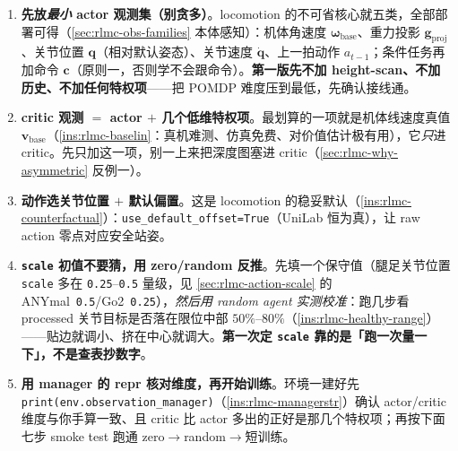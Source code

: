 \begin{enumerate}
  \item \textbf{先放\emph{最小} actor 观测集（别贪多）}。locomotion 的不可省核心就五类，全部部署可得（\cref{sec:rlmc-obs-families} 本体感知）：机体角速度 $\boldsymbol\omega_{\text{base}}$、重力投影 $\mathbf g_{\text{proj}}$、关节位置 $\mathbf q$（相对默认姿态）、关节速度 $\dot{\mathbf q}$、上一拍动作 $a_{t-1}$；条件任务再加命令 $\mathbf c$（原则一，否则学不会跟命令）。\textbf{第一版先不加 height-scan、不加历史、不加任何特权项}——把 POMDP 难度压到最低，先确认接线通。
  \item \textbf{critic 观测 $=$ actor $+$ 几个低维特权项}。最划算的一项就是机体线速度真值 $\mathbf v_{\text{base}}$（\cref{ins:rlmc-baselin}：真机难测、仿真免费、对价值估计极有用），它\emph{只}进 critic。先只加这一项，别一上来把深度图塞进 critic（\cref{sec:rlmc-why-asymmetric} 反例一）。
  \item \textbf{动作选关节位置 $+$ 默认偏置}。这是 locomotion 的稳妥默认（\cref{ins:rlmc-counterfactual}）：\verb|use_default_offset=True|（UniLab 恒为真），让 raw action 零点对应安全站姿。
  \item \textbf{\texttt{scale} 初值不要猜，用 zero/random 反推}。先填一个保守值（腿足关节位置 \verb|scale| 多在 \texttt{0.25}--\texttt{0.5} 量级，见 \cref{sec:rlmc-action-scale} 的 ANYmal~\texttt{0.5}/Go2~\texttt{0.25}），\emph{然后用 random agent 实测校准}：跑几步看 processed 关节目标是否落在限位中部 $50\%$--$80\%$（\cref{ins:rlmc-healthy-range}）——贴边就调小、挤在中心就调大。\textbf{第一次定 \texttt{scale} 靠的是「跑一次量一下」，不是查表抄数字}。
  \item \textbf{用 manager 的 repr 核对维度，再开始训练}。环境一建好先 \verb|print(env.observation_manager)|（\cref{ins:rlmc-managerstr}）确认 actor/critic 维度与你手算一致、且 critic 比 actor 多出的正好是那几个特权项；再按下面七步 smoke test 跑通 zero$\to$random$\to$短训练。
\end{enumerate}

